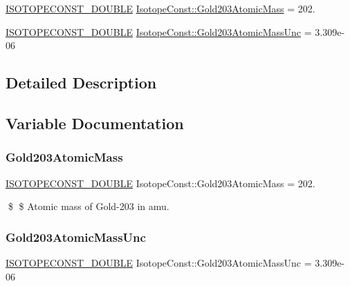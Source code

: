 \begin{DoxyCompactItemize}
\item 
\mbox{\hyperlink{group___isotope_const-_macros_ga8f45a7272ce02c0b4c65c44636ed719a}{I\+S\+O\+T\+O\+P\+E\+C\+O\+N\+S\+T\+\_\+\+D\+O\+U\+B\+LE}} \mbox{\hyperlink{group___isotope_const-_gold-_au203_gafc39736607c797894129c755d87c3787}{Isotope\+Const\+::\+Gold203\+Atomic\+Mass}} = 202.
\item 
\mbox{\hyperlink{group___isotope_const-_macros_ga8f45a7272ce02c0b4c65c44636ed719a}{I\+S\+O\+T\+O\+P\+E\+C\+O\+N\+S\+T\+\_\+\+D\+O\+U\+B\+LE}} \mbox{\hyperlink{group___isotope_const-_gold-_au203_ga0773d715c85d8509596d159b462d1310}{Isotope\+Const\+::\+Gold203\+Atomic\+Mass\+Unc}} = 3.\+309e-\/06
\end{DoxyCompactItemize}


\subsection{Detailed Description}


\subsection{Variable Documentation}
\mbox{\label{group___isotope_const-_gold-_au203_gafc39736607c797894129c755d87c3787}} 
\subsubsection{\texorpdfstring{Gold203\+Atomic\+Mass}{Gold203AtomicMass}}
{\footnotesize\ttfamily \mbox{\hyperlink{group___isotope_const-_macros_ga8f45a7272ce02c0b4c65c44636ed719a}{I\+S\+O\+T\+O\+P\+E\+C\+O\+N\+S\+T\+\_\+\+D\+O\+U\+B\+LE}} Isotope\+Const\+::\+Gold203\+Atomic\+Mass = 202.}

\$ \$ Atomic mass of Gold-\/203 in amu. \mbox{\label{group___isotope_const-_gold-_au203_ga0773d715c85d8509596d159b462d1310}} 
\subsubsection{\texorpdfstring{Gold203\+Atomic\+Mass\+Unc}{Gold203AtomicMassUnc}}
{\footnotesize\ttfamily \mbox{\hyperlink{group___isotope_const-_macros_ga8f45a7272ce02c0b4c65c44636ed719a}{I\+S\+O\+T\+O\+P\+E\+C\+O\+N\+S\+T\+\_\+\+D\+O\+U\+B\+LE}} Isotope\+Const\+::\+Gold203\+Atomic\+Mass\+Unc = 3.\+309e-\/06}

